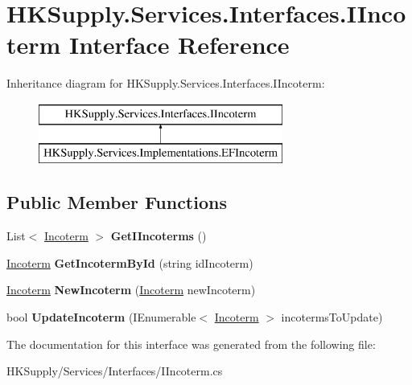 \hypertarget{interface_h_k_supply_1_1_services_1_1_interfaces_1_1_i_incoterm}{}\section{H\+K\+Supply.\+Services.\+Interfaces.\+I\+Incoterm Interface Reference}
\label{interface_h_k_supply_1_1_services_1_1_interfaces_1_1_i_incoterm}
Inheritance diagram for H\+K\+Supply.\+Services.\+Interfaces.\+I\+Incoterm\+:\begin{figure}[H]
\begin{center}
\leavevmode
\includegraphics[height=2.000000cm]{interface_h_k_supply_1_1_services_1_1_interfaces_1_1_i_incoterm}
\end{center}
\end{figure}
\subsection*{Public Member Functions}
\begin{DoxyCompactItemize}
\item 
\mbox{\label{interface_h_k_supply_1_1_services_1_1_interfaces_1_1_i_incoterm_a1b1e3e9d219809c9d1c2d72cfc7b1a9d}} 
List$<$ \mbox{\hyperlink{class_h_k_supply_1_1_models_1_1_incoterm}{Incoterm}} $>$ {\bfseries Get\+I\+Incoterms} ()
\item 
\mbox{\label{interface_h_k_supply_1_1_services_1_1_interfaces_1_1_i_incoterm_a9c89e75c8dc8594cfd635509b1aad08e}} 
\mbox{\hyperlink{class_h_k_supply_1_1_models_1_1_incoterm}{Incoterm}} {\bfseries Get\+Incoterm\+By\+Id} (string id\+Incoterm)
\item 
\mbox{\label{interface_h_k_supply_1_1_services_1_1_interfaces_1_1_i_incoterm_a7832108fd1629b59553c5db3a8b3eacb}} 
\mbox{\hyperlink{class_h_k_supply_1_1_models_1_1_incoterm}{Incoterm}} {\bfseries New\+Incoterm} (\mbox{\hyperlink{class_h_k_supply_1_1_models_1_1_incoterm}{Incoterm}} new\+Incoterm)
\item 
\mbox{\label{interface_h_k_supply_1_1_services_1_1_interfaces_1_1_i_incoterm_a283e29240c35683e51f5dfefb672c251}} 
bool {\bfseries Update\+Incoterm} (I\+Enumerable$<$ \mbox{\hyperlink{class_h_k_supply_1_1_models_1_1_incoterm}{Incoterm}} $>$ incoterms\+To\+Update)
\end{DoxyCompactItemize}


The documentation for this interface was generated from the following file\+:\begin{DoxyCompactItemize}
\item 
H\+K\+Supply/\+Services/\+Interfaces/I\+Incoterm.\+cs\end{DoxyCompactItemize}
